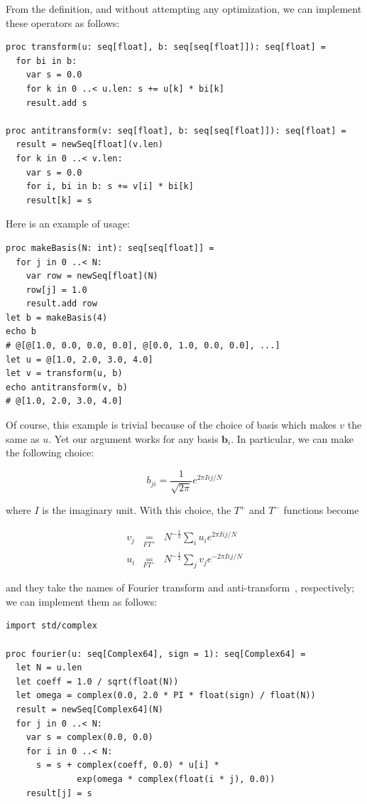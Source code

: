 \documentclass[justified, sixbynine]{tufte-book}
\def\stackunder#1#2{\mathrel{\mathop{#2}\limits_{#1}}}
\theoremstyle{plain}%
\newtheorem * {corollary}{Corollary}
\theoremstyle{definition}
\theoremstyle{remark}
\newtheorem * {remark}{Remark}
\newtheorem * {note}{Note}
\begin{document}
\begin{fullwidth}
From the definition, and without attempting any optimization, we can implement these operators as follows:

\begin{lstlisting}
proc transform(u: seq[float], b: seq[seq[float]]): seq[float] =
  for bi in b:
    var s = 0.0
    for k in 0 ..< u.len: s += u[k] * bi[k]
    result.add s

proc antitransform(v: seq[float], b: seq[seq[float]]): seq[float] =
  result = newSeq[float](v.len)
  for k in 0 ..< v.len:
    var s = 0.0
    for i, bi in b: s += v[i] * bi[k]
    result[k] = s
\end{lstlisting}

Here is an example of usage:

\begin{lstlisting}
proc makeBasis(N: int): seq[seq[float]] =
  for j in 0 ..< N:
    var row = newSeq[float](N)
    row[j] = 1.0
    result.add row
let b = makeBasis(4)
echo b
# @[@[1.0, 0.0, 0.0, 0.0], @[0.0, 1.0, 0.0, 0.0], ...]
let u = @[1.0, 2.0, 3.0, 4.0]
let v = transform(u, b)
echo antitransform(v, b)
# @[1.0, 2.0, 3.0, 4.0]
\end{lstlisting}

Of course, this example is trivial because of the choice of basis which makes $v$ the same as $u$. Yet our argument works for any basis $\mathbf{b}_i$. In particular, we can make the following choice:


\begin{equation}
b_{ji} = \frac{1}{\sqrt{2\pi}} e^{2\pi I ij/N}
\end{equation}

where $I$ is the imaginary unit. With this choice, the $T^+$ and $T^-$ functions become

\begin{eqnarray}
v_j &\stackunder{FT^+}{=}& N^{-\frac12} \sum_i u_i e^{2\pi I ij/N} \\
\label{fourierd1}
u_i &\stackunder{FT^-}{=}& N^{-\frac12} \sum_j v_j e^{-2\pi I ij/N}
\label{fourierd2}
\end{eqnarray}

and they take the names of Fourier transform and anti-transform~\cite{fourier}, respectively;
we can implement them as follows:

\begin{lstlisting}
import std/complex

proc fourier(u: seq[Complex64], sign = 1): seq[Complex64] =
  let N = u.len
  let coeff = 1.0 / sqrt(float(N))
  let omega = complex(0.0, 2.0 * PI * float(sign) / float(N))
  result = newSeq[Complex64](N)
  for j in 0 ..< N:
    var s = complex(0.0, 0.0)
    for i in 0 ..< N:
      s = s + complex(coeff, 0.0) * u[i] *
              exp(omega * complex(float(i * j), 0.0))
    result[j] = s


\end{lstlisting}
\end{fullwidth}
\end{document}
